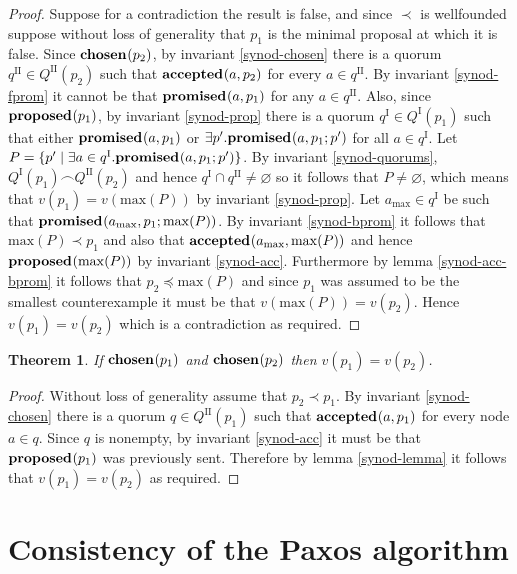 \documentclass[journal]{IEEEtran}
\newtheorem{theorem}{Theorem}
\begin{document}
\begin{proof}Suppose for a contradiction the result is false, and since $\prec$
is wellfounded suppose without loss of generality that $p_1$ is the minimal
proposal at which it is false.  Since $\mathbf{chosen}_{}(p_2)$, by invariant
\ref{synod-chosen} there is a quorum $q^\textrm{II} \in Q^\textrm{II}(p_2)$
such that $\mathbf{accepted}_{}(a,p_2)$ for every $a \in q^\textrm{II}$.  By invariant
\ref{synod-fprom} it cannot be that $\mathbf{promised}_{}(a,p_1)$ for any $a \in
q^\textrm{II}$.  Also, since $\mathbf{proposed}_{}(p_1)$, by invariant \ref{synod-prop}
there is a quorum $q^\textrm{I} \in Q^\textrm{I}(p_1)$ such that either
$\mathbf{promised}_{}(a,p_1)$ or $\exists p'.  \mathbf{promised}_{}(a,p_1;p')$ for all $a \in
q^\textrm{I}$.  Let $P = \{ p' \mid \exists a \in q^\textrm{I}.
\mathbf{promised}_{}(a,p_1;p') \}$.  By invariant \ref{synod-quorums},
${Q^\textrm{I}(p_1) \frown Q^\textrm{II}(p_2)}$ and hence $q^\textrm{I} \cap
q^\textrm{II} \ne \varnothing$ so it follows that $P \ne \varnothing$, which
means that $v(p_1) = v(\mathrm{max}(P))$ by invariant \ref{synod-prop}. Let
$a_{\mathrm{max}} \in q^\textrm{I}$ be such that
$\mathbf{promised}_{}(a_{\mathrm{max}},p_1;\mathrm{max}(P))$.  By invariant
\ref{synod-bprom} it follows that $\mathrm{max}(P) \prec p_1$ and also that
$\mathbf{accepted}_{}(a_{\mathrm{max}},\mathrm{max}(P))$ and hence
$\mathbf{proposed}_{}(\mathrm{max}(P))$ by invariant \ref{synod-acc}. Furthermore by lemma
\ref{synod-acc-bprom} it follows that $p_2 \preceq \mathrm{max}(P)$ and since
$p_1$ was assumed to be the smallest counterexample it must be that
$v(\mathrm{max}(P)) = v(p_2)$.  Hence $v(p_1) = v(p_2)$ which is a
contradiction as required.  \end{proof}

\begin{theorem}\label{synod-safety-theorem} If $\mathbf{chosen}_{}(p_1)$ and
$\mathbf{chosen}_{}(p_2)$ then $v(p_1) = v(p_2)$.  \end{theorem}

\begin{proof} Without loss of generality assume that ${p_2 \prec p_1}$. By
invariant \ref{synod-chosen} there is a quorum $q \in Q^\textrm{II}(p_1)$ such
that $\mathbf{accepted}_{}(a,p_1)$ for every node $a \in q$. Since $q$ is nonempty, by
invariant \ref{synod-acc} it must be that $\mathbf{proposed}_{}(p_1)$ was previously sent.
Therefore by lemma \ref{synod-lemma} it follows that $v(p_1) = v(p_2)$ as
required.  \end{proof}


\section{Consistency of the Paxos algorithm}\label{paxos-invariants}
\end{document}
